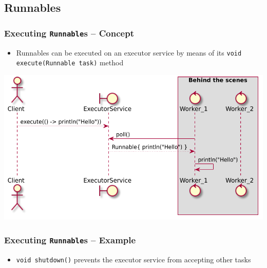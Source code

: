 \documentclass{beamer}\mode<presentation>{\usetheme{AMSCesenaPurpleAndGold}}
\begin{document}
\subsection{Runnables}

\begin{frame}[allowframebreaks]
\frametitle{Executing \texttt{Runnable}s -- Concept}

		

	\framebreak

	\begin{itemize}
		\item Runnables can be \alert{executed} on an executor service by means of its \texttt{void execute(Runnable task)} method
	\end{itemize}
	\begin{center}
		\includegraphics[width=.7\linewidth]{img/execute.pdf}
	\end{center}

\end{frame}

\begin{frame}%
\frametitle{Executing \texttt{Runnable}s -- Example}

	
	
	\vfill
	
	\begin{itemize}
		\item \texttt{void shutdown()} prevents the executor service from accepting other tasks
	\end{itemize}

\end{frame}
\end{document}
